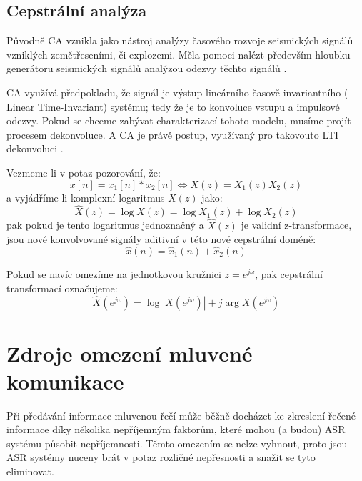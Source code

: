 \subsection{Cepstrální analýza}

Původně CA vznikla jako nástroj analýzy časového rozvoje seismických signálů vzniklých zemětřeseními, či explozemi. Měla pomoci nalézt především hloubku generátoru seismických signálů analýzou odezvy těchto signálů \cite{bogert_1963}.

CA využívá předpokladu, že signál je výstup lineárního časově invariantního ( -- Linear Time-Invariant) systému; tedy že je to konvoluce vstupu a impulsové odezvy. Pokud se chceme zabývat charakterizací tohoto modelu, musíme projít procesem dekonvoluce. A CA je právě postup, využívaný pro takovouto LTI dekonvoluci \cite{tohkura_1987}.

Vezmeme-li v potaz pozorování, že:
%
\begin{equation}
	\label{eq:ca_obs}
	x[n] = x_1[n] * x_2[n] \iff X(z) = X_1(z) X_2(z)
\end{equation}
%
a vyjádříme-li komplexní logaritmus $X(z)$ jako:
%
\begin{equation}
	\label{eq:ca_l}
	\widehat{X}(z) = \log X(z) = \log X_1(z) + \log X_2(z)
\end{equation}
%
pak pokud je tento logaritmus jednoznačný a $\widehat{X}(z)$ je validní z-transformace, jsou nové konvolvované signály aditivní v této nové cepstrální doméně:
%
\begin{equation}
	\label{eq:ca_xl}
	\widehat{x}(n) = \widehat{x}_1(n) + \widehat{x}_2(n)
\end{equation}

Pokud se navíc omezíme na jednotkovou kružnici $z = e^{j\omega}$, pak cepstrální transformací označujeme:
%
\begin{equation}
	\label{eq:ca_f}
	\widehat{X}(e^{j\omega}) = \log |X(e^{j\omega})| + j \arg X(e^{j\omega})
\end{equation}

\section{Zdroje omezení mluvené komunikace}

Při předávání informace mluvenou řečí může běžně docházet ke zkreslení řečené informace díky několika nepříjemným faktorům, které mohou (a budou) ASR systému působit nepříjemnosti. Těmto omezením se nelze vyhnout, proto jsou ASR systémy nuceny brát v potaz rozličné nepřesnosti a snažit se tyto eliminovat.

